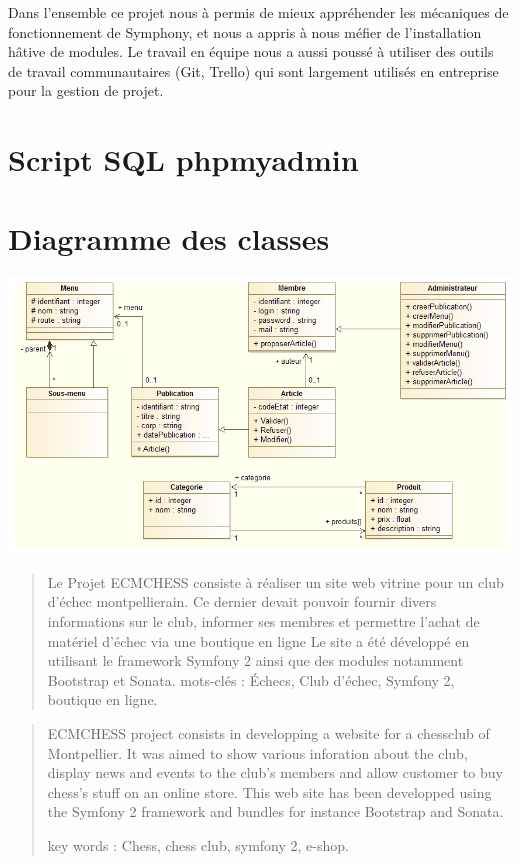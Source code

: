 \documentclass[a4paper,12pt, notitlepage]{report}
\begin{document}
Dans l’ensemble ce projet nous à permis de mieux appréhender les mécaniques de fonctionnement de Symphony, et nous a appris à nous méfier de l’installation hâtive de modules. Le travail en équipe nous a aussi poussé à utiliser des outils de travail communautaires (Git, Trello) qui sont largement utilisés en entreprise pour la gestion de projet.



\appendix{}
\chapter{Script SQL phpmyadmin}


\chapter{Diagramme des classes}
\includegraphics[scale=0.52]{images/diagramme-de-classe.png}

\listoffigures

\newpage
\pagestyle{empty}
\begin{abstract}
Le Projet ECMCHESS consiste à réaliser un site web vitrine pour un club d’échec montpellierain.
Ce dernier devait pouvoir fournir divers informations sur le club, informer ses membres et permettre l’achat de matériel d’échec via une boutique en ligne
Le site a été développé en utilisant le framework Symfony 2 ainsi que des modules notamment Bootstrap et Sonata.
mots-clés : Échecs, Club d’échec, Symfony 2, boutique en ligne.
\end{abstract}
\begin{abstract}
ECMCHESS project consists in developping a website for a chessclub of Montpellier.
It was aimed to show various inforation about the club, display news and events to the club’s members and allow customer to buy chess’s stuff on an online store.
This web site has been developped using the Symfony 2 framework and bundles for instance Bootstrap and Sonata.

key words : Chess, chess club, symfony 2, e-shop.
\end{abstract}
\end{document}
